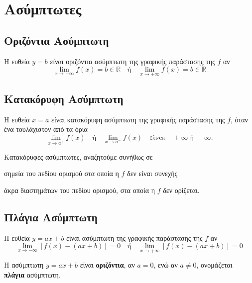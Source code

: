 \section*{Ασύμπτωτες}

\subsection*{Οριζόντια Ασύμπτωτη}

\begin{dfn}
  Η ευθεία $ y=b $ είναι \textcolor{Col1}{οριζόντια ασύμπτωτη} της γραφικής παράστασης 
  της $f$ αν 
  \[ 
    \lim_{x \to - \infty} f(x) = b \in \mathbb{R} \quad \text{ή} \quad 
    \lim_{x \to + \infty} f(x) = b \in \mathbb{R}
  \]
\end{dfn}

\subsection*{Κατακόρυφη Ασύμπτωτη}

\begin{dfn}
  Η ευθεία $ x=a $ είναι \textcolor{Col1}{κατακόρυφη ασύμπτωτη} της γραφικής παράστασης 
  της $f$, όταν ένα τουλάχιστον από τα όρια 
  \[
    \lim_{x \to a^{+}} f(x) \quad \text{ή} \quad \lim_{x \to a^{-}} f(x) \quad
    \text{είναι} \quad  + \infty  \; \text{ή} \;  - \infty .
  \] 
\end{dfn}

\begin{rem}
 Κατακόρυφες ασύμπτωτες, αναζητούμε συνήθως σε 
 \begin{myitemize}
   \item σημεία του πεδίου ορισμού στα οποία η $f$ δεν είναι συνεχής 
   \item άκρα διαστημάτων του πεδίου ορισμού, στα οποία η $f$ δεν ορίζεται.
 \end{myitemize}
\end{rem}

\subsection*{Πλάγια Ασύμπτωτη}
\begin{dfn}
  Η ευθεία $ y=ax+b $ είναι \textcolor{Col1}{ασύμπτωτη} της γραφικής παράστασης της 
  $ f $ αν 
  \[
    \lim_{x \to - \infty} [f(x) - (ax+b)] = 0 \quad \text{ή} \quad 
    \lim_{x \to + \infty} [f(x) - (ax+b)] = 0
  \] 
\end{dfn}

\begin{rem}
 Η ασύμπτωτη $ y=ax+b $ είναι \textbf{οριζόντια}, αν $ a=0 $, ενώ αν $ a \neq 0 $, 
 ονομάζεται \textbf{πλάγια} ασύμπτωτη.
\end{rem}

